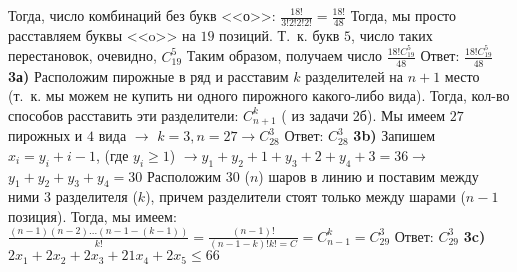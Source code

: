 \documentclass[12pt,a4paper,fleqn]{article}
\begin{document}
Тогда, число комбинаций без букв <<о>>: \newline
$\frac{18!}{3!2!2!2!} = \frac{18!}{48}$ \newline
Тогда, мы просто расставляем буквы <<o>> на $19$ позиций. Т.~к. букв $5$, число таких перестановок, очевидно, $C_{19}^5$ \newline
Таким образом, получаем число $\frac{18! C_{19}^5}{48}$ \newline
Ответ: $\frac{18! C_{19}^5}{48}$ \newline \newline
{\bf 3а)} Расположим пирожные в ряд и расставим $k$ разделителей на $n + 1$ место (т.~к. мы можем не купить ни одного пирожного какого-либо вида). Тогда, кол-во способов расставить эти разделители: $C_{n+1}^k$ ( из задачи 2б). Мы имеем $27$ пирожных и $4$ вида $\rightarrow$ $k = 3, n = 27 \rightarrow C_{28}^3$ \newline
Ответ: $C_{28}^3$ \newline \newline
{\bf 3b)} Запишем $x_i = y_i + i - 1$, (где $y_i \geqslant 1$) $\rightarrow y_1 + y_2 + 1 + y_3 + 2 + y_4 + 3 = 36 \rightarrow$ \newline
$y_1 + y_2 + y_3 + y_4 = 30$ \newline
Расположим $30$ ($n$) шаров в линию и поставим между ними $3$ разделителя ($k$), причем разделители стоят только между шарами ($n - 1$ позиция). Тогда, мы имеем:\newline
$\frac{(n-1)(n-2)...(n - 1 - (k - 1))}{k!} = \frac{(n-1)!}{(n - 1 - k)!k! = C_{}} = C_{n-1}^k = C_{29}^3$ \newline
Ответ: $C_{29}^3$ \newline \newline
{\bf 3c)} $2x_1 + 2x_2 + 2x_3 + 21x_4 + 2x_5 \leqslant 66$
\end{document}
